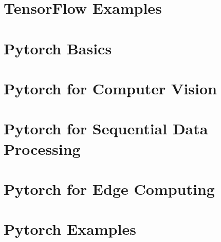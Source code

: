 \section{TensorFlow Examples}

\section{Pytorch Basics}

\section{Pytorch for Computer Vision}

\section{Pytorch for Sequential Data Processing}

\section{Pytorch for Edge Computing}

\section{Pytorch Examples} 
